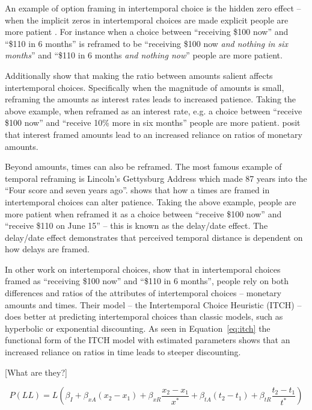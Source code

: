 \documentclass[]{article}
\begin{document}
An example of option framing in intertemporal choice is the hidden zero effect -- when the implicit zeros in intertemporal choices are made explicit people are more patient \cite{Magen2008}. 
For instance when a choice between ``receiving \$100 now'' and ``\$110 in 6 months'' is reframed to be  ``receiving \$100 now \textit{and nothing in six months}'' and ``\$110 in 6 months \textit{and nothing now}'' people are more patient. 

Additionally  show that making the ratio between amounts salient affects intertemporal choices. 
Specifically when the magnitude of amounts is small, reframing the amounts as interest rates leads to increased patience. Taking the above example, when reframed as an interest rate, e.g.  a choice between  ``receive \$100 now'' and ``receive 10\% more in six months'' people are more patient.  posit that interest framed amounts lead to an increased reliance on ratios of monetary amounts.

Beyond amounts, times can also be reframed.
The most famous example of temporal reframing is  Lincoln's Gettysburg Address which made 87 years into the ``Four score and seven years ago''.
 shows that how a times are framed in intertemporal choices can alter patience. 
Taking the above example, people are more patient when reframed it as a choice between  ``receive \$100 now'' and ``receive \$110 on June 15'' -- this is known as the delay/date effect. 
The delay/date effect demonstrates that perceived temporal distance is dependent on how delays are framed. 

In other work on intertemporal choices,  show that in intertemporal choices framed as ``receiving \$100 now'' and ``\$110 in 6 months'', people rely on both differences and ratios of the  attributes of intertemporal choices -- monetary amounts and times.
Their model -- the Intertemporal Choice Heuristic (ITCH) -- does better at predicting intertemporal choices than classic models, such as hyperbolic or exponential discounting. 
As seen in Equation~\ref{eq:itch}  the functional form of the ITCH model with estimated parameters shows that an increased reliance on ratios in time leads to steeper discounting. 

[What are they?]
 
 \begin{equation}\label{eq:itch}
 P(LL) = L \left(\beta_I + \beta_{xA}(x_2 - x_1) + \beta_{xR} \frac{x_2 - x_1}{x^*} + \beta_{tA}(t_2 - t_1) + \beta_{tR} \frac{t_2 - t_1}{t^*}\right)
 \end{equation}
 
\end{document}
